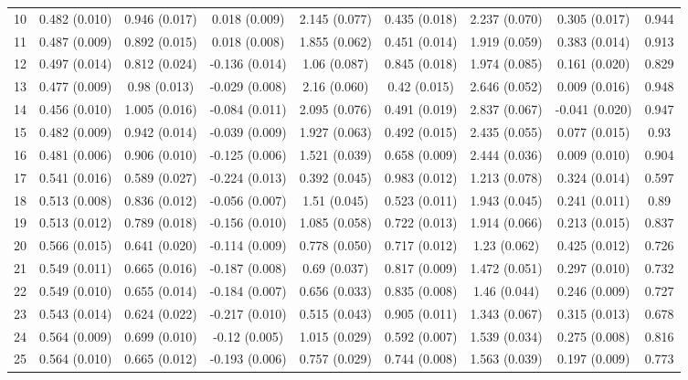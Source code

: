 \begin{tabular}{@{\extracolsep{5pt}} l cccccccc}
10 & 0.482 (0.010) & 0.946 (0.017) & 0.018 (0.009) & 2.145 (0.077) & 0.435 (0.018) & 2.237 (0.070) & 0.305 (0.017) & 0.944 \\ 
11 & 0.487 (0.009) & 0.892 (0.015) & 0.018 (0.008) & 1.855 (0.062) & 0.451 (0.014) & 1.919 (0.059) & 0.383 (0.014) & 0.913 \\ 
12 & 0.497 (0.014) & 0.812 (0.024) & -0.136 (0.014) & 1.06 (0.087) & 0.845 (0.018) & 1.974 (0.085) & 0.161 (0.020) & 0.829 \\ 
13 & 0.477 (0.009) & 0.98 (0.013) & -0.029 (0.008) & 2.16 (0.060) & 0.42 (0.015) & 2.646 (0.052) & 0.009 (0.016) & 0.948 \\ 
14 & 0.456 (0.010) & 1.005 (0.016) & -0.084 (0.011) & 2.095 (0.076) & 0.491 (0.019) & 2.837 (0.067) & -0.041 (0.020) & 0.947 \\ 
15 & 0.482 (0.009) & 0.942 (0.014) & -0.039 (0.009) & 1.927 (0.063) & 0.492 (0.015) & 2.435 (0.055) & 0.077 (0.015) & 0.93 \\ 
16 & 0.481 (0.006) & 0.906 (0.010) & -0.125 (0.006) & 1.521 (0.039) & 0.658 (0.009) & 2.444 (0.036) & 0.009 (0.010) & 0.904 \\ 
17 & 0.541 (0.016) & 0.589 (0.027) & -0.224 (0.013) & 0.392 (0.045) & 0.983 (0.012) & 1.213 (0.078) & 0.324 (0.014) & 0.597 \\ 
18 & 0.513 (0.008) & 0.836 (0.012) & -0.056 (0.007) & 1.51 (0.045) & 0.523 (0.011) & 1.943 (0.045) & 0.241 (0.011) & 0.89 \\ 
19 & 0.513 (0.012) & 0.789 (0.018) & -0.156 (0.010) & 1.085 (0.058) & 0.722 (0.013) & 1.914 (0.066) & 0.213 (0.015) & 0.837 \\ 
20 & 0.566 (0.015) & 0.641 (0.020) & -0.114 (0.009) & 0.778 (0.050) & 0.717 (0.012) & 1.23 (0.062) & 0.425 (0.012) & 0.726 \\ 
21 & 0.549 (0.011) & 0.665 (0.016) & -0.187 (0.008) & 0.69 (0.037) & 0.817 (0.009) & 1.472 (0.051) & 0.297 (0.010) & 0.732 \\ 
22 & 0.549 (0.010) & 0.655 (0.014) & -0.184 (0.007) & 0.656 (0.033) & 0.835 (0.008) & 1.46 (0.044) & 0.246 (0.009) & 0.727 \\ 
23 & 0.543 (0.014) & 0.624 (0.022) & -0.217 (0.010) & 0.515 (0.043) & 0.905 (0.011) & 1.343 (0.067) & 0.315 (0.013) & 0.678 \\ 
24 & 0.564 (0.009) & 0.699 (0.010) & -0.12 (0.005) & 1.015 (0.029) & 0.592 (0.007) & 1.539 (0.034) & 0.275 (0.008) & 0.816 \\ 
25 & 0.564 (0.010) & 0.665 (0.012) & -0.193 (0.006) & 0.757 (0.029) & 0.744 (0.008) & 1.563 (0.039) & 0.197 (0.009) & 0.773 \\ 

\end{tabular}
